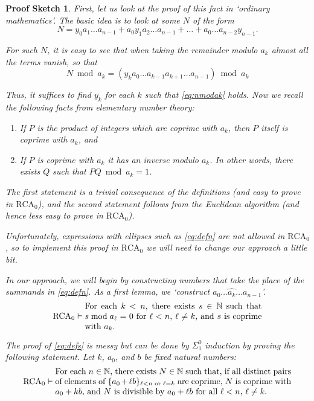 \documentclass{article}
\theoremstyle{nonumberplain}
\newtheorem{sketch}{Proof Sketch}
\newcommand{\N}{\mathbb{N}}
\newcommand{\RCA}{\mathrm{RCA}}
\begin{document}
\begin{sketch}
First, let us look at the proof of this fact in `ordinary mathematics'. The basic idea is to look at some $N$ of the form
\begin{equation}\label{eq:defn}
N = y_0 a_1 \dots a_{n-1} + a_0 y_1 a_2 \dots a_{n-1} + \dots + a_0 \dots a_{n-2} y_{n-1}.
\end{equation}

For such $N$, it is easy to see that when taking the remainder modulo $a_k$ almost all the terms vanish, so that
\begin{equation}\label{eq:nmodak}
N \bmod a_k = \left( y_k a_0 \dots a_{k-1} a_{k+1} \dots a_{n-1} \right) \bmod a_k
\end{equation}

Thus, it suffices to find $y_k$ for each $k$ such that \eqref{eq:nmodak} holds. Now we recall the following facts from elementary number theory:
\begin{enumerate}
\item If $P$ is the product of integers which are coprime with $a_k$, then $P$ itself is coprime with $a_k$, and
\item If $P$ is coprime with $a_k$ it has an inverse modulo $a_k$. In other words, there exists $Q$ such that $PQ \bmod a_k = 1$.
\end{enumerate}

The first statement is a trivial consequence of the definitions (and easy to prove in $\RCA_0$), and the second statement follows from the Euclidean algorithm (and hence less easy to prove in $\RCA_0$).

Unfortunately, expressions with ellipses such as \eqref{eq:defn} are not allowed in $\RCA_0$, so to implement this proof in $\RCA_0$ we will need to change our approach a little bit.

\medskip

In our approach, we will begin by constructing numbers that take the place of the summands in \eqref{eq:defn}. As a first lemma, we `construct $a_0 \dots \widehat{a_{k}} \dots a_{n-1}$'.
\begin{equation}\label{eq:defs}
\RCA_0 \vdash \parbox{21em}{For each $k < n$, there exists $s \in \N$ such that $s \bmod a_\ell = 0$ for $\ell < n$, $\ell \neq k$, and $s$ is coprime with $a_k$.}
\end{equation}

The proof of \eqref{eq:defs} is messy but can be done by $\Sigma^0_1$ induction by proving the following statement. Let $k$, $a_0$, and $b$ be fixed natural numbers:
\begin{equation}\label{eq:defs2}
\RCA_0 \vdash \parbox{28em}{For each $n \in \N$, there exists $N \in \N$ such that, if all distinct pairs of elements of $\{a_0 + \ell b\}_{\ell < n \text{ or } \ell = k}$ are coprime, $N$ is coprime with $a_0 + k b$, and $N$ is divisible by $a_0 + \ell b$ for all $\ell < n$, $\ell \neq k$.}
\end{equation}


\end{sketch}
\end{document}
